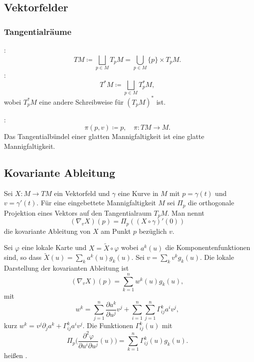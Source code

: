 \subsection{Vektorfelder}
\subsubsection{Tangentialräume}

:
\begin{equation}
TM\coloneq \bigsqcup_{p\in M} T_p M = \bigcup_{p\in M} \{p\}\times T_p M.
\end{equation}
:
\begin{equation}
T^*M \coloneq \bigsqcup_{p\in M} T_p^* M,
\end{equation}
wobei $T_p^* M$ eine andere Schreibweise für
$(T_p M)^*$ ist.

:
\begin{equation}
\pi(p,v)\coloneq p,\quad\pi\colon TM\to M.
\end{equation}
Das Tangentialbündel einer glatten Mannigfaltigkeit ist eine
glatte Mannigfaltigkeit.

\subsection{Kovariante Ableitung}
\begin{definition}
Sei $X\colon M\to TM$ ein Vektorfeld und $\gamma$ eine Kurve
in $M$ mit $p=\gamma(t)$ und $v=\gamma'(t)$. Für eine eingebettete
Mannigfaltigkeit $M$ sei $\Pi_p$ die orthogonale Projektion eines Vektors
auf den Tangentialraum $T_p M$. Man nennt%
\begin{equation}
(\nabla_v X)(p) = \Pi_p((X\circ\gamma)'(0))
\end{equation}
die kovariante Ableitung von $X$ am Punkt $p$ bezüglich $v$.
\end{definition}
Sei $\varphi$ eine lokale Karte und $X=\tilde X\circ\varphi$ wobei
$a^k(u)$ die Komponentenfunktionen sind, so dass
$\tilde X(u) = \sum_k a^k(u) g_k(u)$. Sei $v=\sum_k v^k g_k(u)$.
Die lokale Darstellung der kovarianten Ableitung ist
\begin{equation}
(\nabla_v X)(p) = \sum_{k=1}^n w^k(u) g_k(u),
\end{equation}
mit
\begin{equation}
w^k = \sum_{j=1}^n \frac{\partial a^k}{\partial u^j}v^j
+ \sum_{i=1}^n\sum_{j=1}^n \Gamma_{ij}^k a^i v^j,
\end{equation}
kurz $w^k = v^j\partial_j a^k + \Gamma_{ij}^k a^i v^j$. Die
Funktionen $\Gamma_{ij}^k(u)$ mit%
\begin{equation}
\Pi_p\Big(\frac{\partial^2\varphi}{\partial u^i\partial u^j}(u)\Big)
= \sum_{k=1}^n\Gamma_{ij}^k(u) g_k(u).
\end{equation}
heißen .

